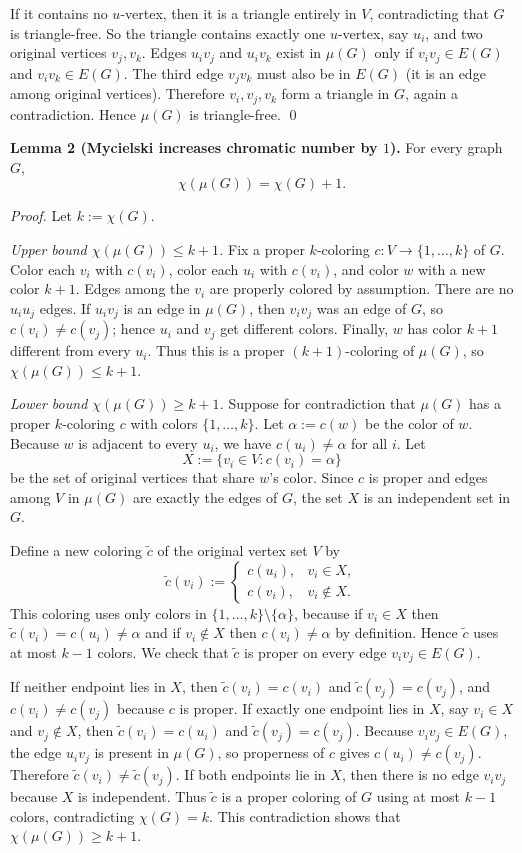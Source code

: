 If it contains no $u$-vertex, then it is a triangle entirely in $V$, contradicting that $G$ is triangle-free.
So the triangle contains exactly one $u$-vertex, say $u_i$, and two original vertices $v_j,v_k$.
Edges $u_i v_j$ and $u_i v_k$ exist in $\mu(G)$ only if $v_i v_j\in E(G)$ and $v_i v_k\in E(G)$.
The third edge $v_jv_k$ must also be in $E(G)$ (it is an edge among original vertices).
Therefore $v_i,v_j,v_k$ form a triangle in $G$, again a contradiction.
Hence $\mu(G)$ is triangle-free. \qed

\medskip
\noindent\textbf{Lemma 2 (Mycielski increases chromatic number by $1$).}
For every graph $G$,
\[\chi(\mu(G))=\chi(G)+1.
\]

\noindent\emph{Proof.}
Let $k:=\chi(G)$.

\emph{Upper bound $\chi(\mu(G))\le k+1$.}
Fix a proper $k$-coloring $c:V\to\{1,\dots,k\}$ of $G$.
Color each $v_i$ with $c(v_i)$, color each $u_i$ with $c(v_i)$, and color $w$ with a new color $k+1$.
Edges among the $v_i$ are properly colored by assumption.
There are no $u_i u_j$ edges.
If $u_i v_j$ is an edge in $\mu(G)$, then $v_i v_j$ was an edge of $G$, so $c(v_i)\ne c(v_j)$; hence $u_i$ and $v_j$ get different colors.
Finally, $w$ has color $k+1$ different from every $u_i$.
Thus this is a proper $(k+1)$-coloring of $\mu(G)$, so $\chi(\mu(G))\le k+1$.

\emph{Lower bound $\chi(\mu(G))\ge k+1$.}
Suppose for contradiction that $\mu(G)$ has a proper $k$-coloring $c$ with colors $\{1,\dots,k\}$.
Let $\alpha:=c(w)$ be the color of $w$.
Because $w$ is adjacent to every $u_i$, we have $c(u_i)\ne \alpha$ for all $i$.
Let
\[X:=\{v_i\in V: c(v_i)=\alpha\}
\]
be the set of original vertices that share $w$'s color.
Since $c$ is proper and edges among $V$ in $\mu(G)$ are exactly the edges of $G$, the set $X$ is an independent set in $G$.

Define a new coloring $\tilde c$ of the original vertex set $V$ by
\[\tilde c(v_i):=\begin{cases}
 c(u_i), & v_i\in X,\\
 c(v_i), & v_i\notin X.
\end{cases}
\]
This coloring uses only colors in $\{1,\dots,k\}\setminus\{\alpha\}$, because if $v_i\in X$ then $\tilde c(v_i)=c(u_i)\ne\alpha$ and if $v_i\notin X$ then $c(v_i)\ne\alpha$ by definition.
Hence $\tilde c$ uses at most $k-1$ colors.
We check that $\tilde c$ is proper on every edge $v_iv_j\in E(G)$.

If neither endpoint lies in $X$, then $\tilde c(v_i)=c(v_i)$ and $\tilde c(v_j)=c(v_j)$, and $c(v_i)\ne c(v_j)$ because $c$ is proper.
If exactly one endpoint lies in $X$, say $v_i\in X$ and $v_j\notin X$, then $\tilde c(v_i)=c(u_i)$ and $\tilde c(v_j)=c(v_j)$.
Because $v_iv_j\in E(G)$, the edge $u_i v_j$ is present in $\mu(G)$, so properness of $c$ gives $c(u_i)\ne c(v_j)$.
Therefore $\tilde c(v_i)\ne \tilde c(v_j)$.
If both endpoints lie in $X$, then there is no edge $v_iv_j$ because $X$ is independent.
Thus $\tilde c$ is a proper coloring of $G$ using at most $k-1$ colors, contradicting $\chi(G)=k$.
This contradiction shows that $\chi(\mu(G))\ge k+1$.

